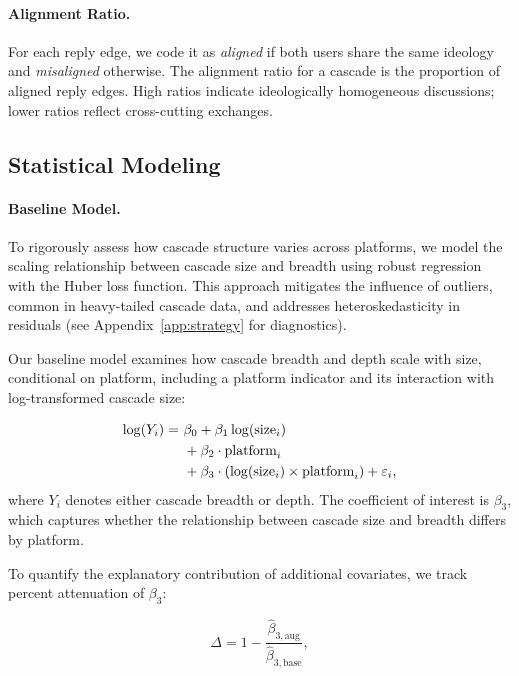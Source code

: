 \documentclass[letterpaper]{article} %
\begin{document}
\paragraph*{Alignment Ratio.}
For each reply edge, we code it as \textit{aligned} if both users share the same ideology and \textit{misaligned} otherwise. The alignment ratio for a cascade is the proportion of aligned reply edges. High ratios indicate ideologically homogeneous discussions; lower ratios reflect cross-cutting exchanges. 

\subsection{Statistical Modeling}

\paragraph*{Baseline Model.}
To rigorously assess how cascade structure varies across platforms, we model the scaling relationship between cascade size and breadth using robust regression with the Huber loss function. This approach mitigates the influence of outliers, common in heavy-tailed cascade data, and addresses heteroskedasticity in residuals (see Appendix~\ref{app:strategy} for diagnostics).

Our baseline model examines how cascade breadth and depth scale with size, conditional on platform, including a platform indicator and its interaction with log-transformed cascade size:

\begin{align}
\label{eq:eq1}
\log(Y_i) =\ & \beta_0 + \beta_1 \log(\text{size}_i) \notag \\
             & + \beta_2 \cdot \text{platform}_i \notag \\
             & + \beta_3 \cdot \left( \log(\text{size}_i) \times \text{platform}_i \right) + \varepsilon_i ,
\end{align}
where $Y_i$ denotes either cascade breadth or depth. The coefficient of interest is $\beta_3$, which captures whether the relationship between cascade size and breadth differs by platform.

To quantify the explanatory contribution of additional covariates, we track percent attenuation of $\beta_3$:

\begin{equation}
\Delta = 1 - \frac{\hat{\beta}_{3,\text{aug}}}{\hat{\beta}_{3,\text{base}}} ,
\end{equation}
\end{document}
